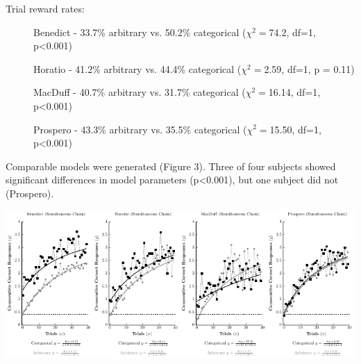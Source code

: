 \documentclass[a0,portrait]{a0poster}
\begin{document}
\begin{multicols}{2}
Trial reward rates:
{\small
\begin{description}
\item[] Benedict - 33.7\% arbitrary vs. 50.2\% categorical ($\chi^2=$74.2, df=1, p\textless 0.001)
\item[] Horatio - 41.2\% arbitrary vs. 44.4\% categorical ($\chi^2=$2.59, df=1, p = 0.11)
\item[] MacDuff - 40.7\% arbitrary vs. 31.7\% categorical ($\chi^2=$16.14, df=1, p\textless 0.001)
\item[] Prospero - 43.3\% arbitrary vs. 35.5\% categorical ($\chi^2=$15.50, df=1, p\textless 0.001)
\end{description}
}

Comparable models were generated (Figure 3). Three of four subjects showed significant differences in model parameters (p\textless 0.001), but one subject did not (Prospero).
	

\begin{center}\vspace{1cm}
\includegraphics[width=1\linewidth]{Figure-04.pdf}
\end{center}\vspace{1cm}
%
%



\end{multicols}
\end{document}
